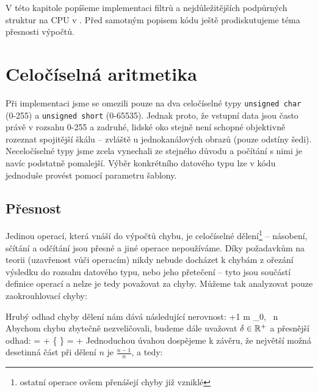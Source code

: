 

V této kapitole popíšeme implementaci filtrů a nejdůležitějších podpůrných struktur na CPU v \Cpp. Před samotným popisem kódu ještě prodiskutujeme téma přesnosti výpočtů.

    \section{Celočíselná aritmetika}

    Při implementaci jsme se omezili pouze na dva celočíselné typy {\tt unsigned char} (0-255) a {\tt unsigned short} (0-65535). Jednak proto, že vstupní data jsou často právě v rozsahu 0-255 a zadruhé, lidské oko stejně není schopné objektivně rozeznat spojitější škálu -- zvláště u jednokanálových obrazů (pouze odstíny šedi). Neceločíselné typy jsme zcela vynechali ze stejného důvodu a počítání s nimi je navíc podstatně pomalejší. Výběr konkrétního datového typu lze v kódu jednoduše provést pomocí parametru šablony.

        \subsection{Přesnost}

        Jedinou operací, která vnáší do výpočtů chybu, je celočíselné dělení\footnote{ostatní operace ovšem přenášejí chyby již vzniklé} -- násobení, sčítání a odčítání jsou přesné a jiné operace nepoužíváme. Díky požadavkům na teorii (uzavřenost vůči operacím) nikdy nebude docházet k chybám z ořezání výsledku do rozsahu datového typu, nebo jeho přetečení -- tyto jsou součástí definice operací a nelze je tedy považovat za chyby. Můžeme tak analyzovat pouze zaokrouhlovací chyby:

        Hrubý odhad chyby dělení nám dává následující nerovnost:
        \beq
         \le \Big\lfloor {} \Big\rfloor +1 \qquad m \in \Nn_0, \, n \in \Nn
        \eeq
        Abychom chybu zbytečně nezveličovali, budeme dále uvažovat $\delta \in \mathbb{R}^+$ a přesnější odhad:
        \beq
         = \Big\lfloor {} \Big\rfloor + \Big\{  \Big\} = \Big\lfloor {} \Big\rfloor + \delta
        \eeq
        Jednoduchou úvahou dospějeme k závěru, že největší možná desetinná část při dělení $n$ je $\frac{n-1}{n}$, a tedy:
        \beq
        \delta \leq {}
        \eeq

